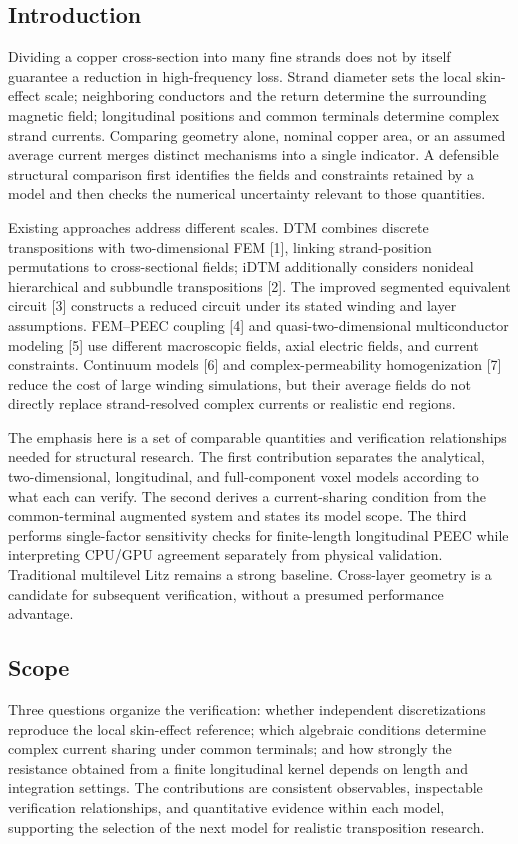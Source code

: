 \documentclass[11pt]{article}
\begin{document}
\subsection*{Introduction}
\hypertarget{01.introduction.heading}{}
Dividing a copper cross-section into many fine strands does not by itself guarantee a reduction in high-frequency loss. Strand diameter sets the local skin-effect scale; neighboring conductors and the return determine the surrounding magnetic field; longitudinal positions and common terminals determine complex strand currents. Comparing geometry alone, nominal copper area, or an assumed average current merges distinct mechanisms into a single indicator. A defensible structural comparison first identifies the fields and constraints retained by a model and then checks the numerical uncertainty relevant to those quantities.


Existing approaches address different scales. DTM combines discrete transpositions with two-dimensional FEM [1], linking strand-position permutations to cross-sectional fields; iDTM additionally considers nonideal hierarchical and subbundle transpositions [2]. The improved segmented equivalent circuit [3] constructs a reduced circuit under its stated winding and layer assumptions. FEM–PEEC coupling [4] and quasi-two-dimensional multiconductor modeling [5] use different macroscopic fields, axial electric fields, and current constraints. Continuum models [6] and complex-permeability homogenization [7] reduce the cost of large winding simulations, but their average fields do not directly replace strand-resolved complex currents or realistic end regions.


The emphasis here is a set of comparable quantities and verification relationships needed for structural research. The first contribution separates the analytical, two-dimensional, longitudinal, and full-component voxel models according to what each can verify. The second derives a current-sharing condition from the common-terminal augmented system and states its model scope. The third performs single-factor sensitivity checks for finite-length longitudinal PEEC while interpreting CPU/GPU agreement separately from physical validation. Traditional multilevel Litz remains a strong baseline. Cross-layer geometry is a candidate for subsequent verification, without a presumed performance advantage.


\subsection*{Scope}
\hypertarget{01.scope.heading}{}
Three questions organize the verification: whether independent discretizations reproduce the local skin-effect reference; which algebraic conditions determine complex current sharing under common terminals; and how strongly the resistance obtained from a finite longitudinal kernel depends on length and integration settings. The contributions are consistent observables, inspectable verification relationships, and quantitative evidence within each model, supporting the selection of the next model for realistic transposition research.
\end{document}
